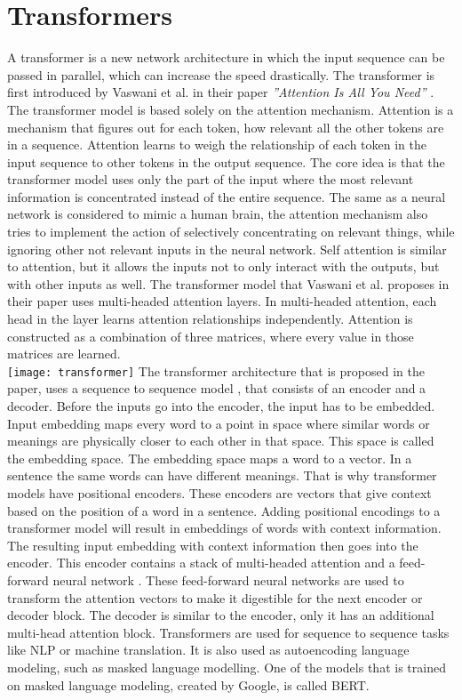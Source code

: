 \section{Transformers}
A transformer is a new network architecture in which the input sequence can be passed in parallel, which can increase the speed drastically. The transformer is first introduced by Vaswani et al. in their paper \textit{”Attention Is All You Need”} \cite{Transformers}. The transformer model is based solely on the attention mechanism. Attention is a mechanism that figures out for each token, how relevant all the other tokens are in a sequence. Attention learns to weigh the relationship of each token in the input sequence to other tokens in the output sequence. The core idea is that the transformer model uses only the part of the input where the most relevant information is concentrated instead of the entire sequence. The same as a neural network is considered to mimic a human brain, the attention mechanism also tries to implement the action of selectively concentrating on relevant things, while ignoring other not relevant inputs in the neural network. Self attention is similar to attention, but it allows the inputs not to only interact with the outputs, but with other inputs as well.  The transformer model that Vaswani et al. proposes in their paper uses multi-headed attention layers. In multi-headed attention, each head in the layer learns attention relationships independently. Attention is constructed as a combination of three matrices, where every value in those matrices are learned.\\
\texttt{[image: transformer]}
The transformer architecture that is proposed in the paper, uses a sequence to sequence model \cite{sts}, that consists of an encoder and a decoder. Before the inputs go into the encoder, the input has to be embedded. Input embedding maps every word to a point in space where similar words or meanings are physically closer to each other in that space. This space is called the embedding space. The embedding space maps a word to a vector. In a sentence the same words can have different meanings. That is why transformer models have positional encoders. These encoders are vectors that give context based on the position of a word in a sentence. Adding positional encodings to a transformer model will result in embeddings of words with context information. The resulting input embedding with context information then goes into the encoder. This encoder contains a stack of multi-headed attention and a feed-forward neural network \cite{ffn}. These feed-forward neural networks are used to transform the attention vectors to make it digestible for the next encoder or decoder block. The decoder is similar to the encoder, only it has an additional multi-head attention block. Transformers are used for sequence to sequence tasks like NLP or machine translation. It is also used as autoencoding language modeling, such as masked language modelling. One of the models that is trained on masked language modeling, created by Google, is called BERT. 

